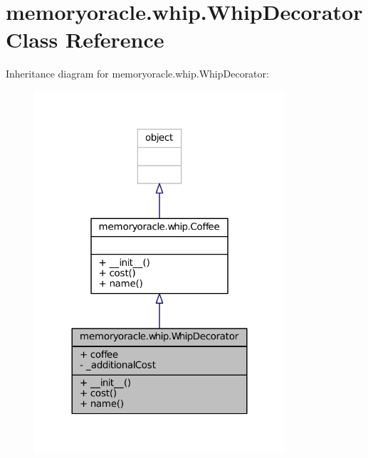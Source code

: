 \hypertarget{classmemoryoracle_1_1whip_1_1WhipDecorator}{}\section{memoryoracle.\+whip.\+Whip\+Decorator Class Reference}
\label{classmemoryoracle_1_1whip_1_1WhipDecorator}


Inheritance diagram for memoryoracle.\+whip.\+Whip\+Decorator\+:\nopagebreak
\begin{figure}[H]
\begin{center}
\leavevmode
\includegraphics[width=264pt]{classmemoryoracle_1_1whip_1_1WhipDecorator__inherit__graph}
\end{center}
\end{figure}


